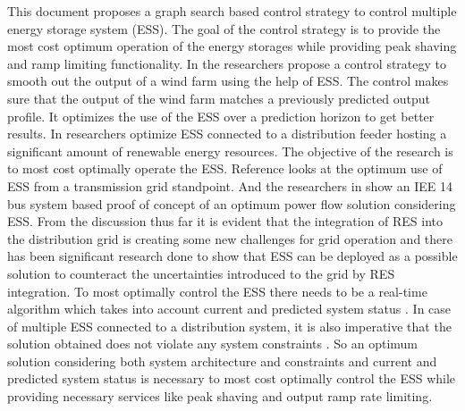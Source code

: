 \documentclass[journal]{IEEEtran}
\begin{document}
This document proposes a graph search based control strategy to control multiple energy storage system (ESS). The goal of the control strategy is to provide the most cost optimum operation of the energy storages while providing peak shaving and ramp limiting functionality. In \cite{IM1} the researchers propose a control strategy to smooth out the output of a wind farm using the help of ESS. The control makes sure that the output of the wind farm matches a previously predicted output profile. It optimizes the use of the ESS over a prediction horizon to get better results. In \cite{IM2} researchers optimize ESS connected to a distribution feeder hosting a significant amount of renewable energy resources. The objective of the research is to most cost optimally operate the ESS. Reference \cite{IM3} looks at the optimum use of ESS from a transmission grid standpoint. And the researchers in \cite{IM4} show an IEE 14 bus system based proof of concept of an optimum power flow solution considering ESS. From the discussion thus far it is evident that the integration of RES into the distribution grid is creating some new challenges for grid operation and there has been significant research done to show that ESS can be deployed as a possible solution to counteract the uncertainties introduced to the grid by RES integration. To most optimally control the ESS there needs to be a real-time algorithm which takes into account current and predicted system status \cite{gupta_francis_ospina_newaz_2018}. In case of multiple ESS connected to a distribution system, it is also imperative that the solution obtained does not violate any system constraints \cite{rt4}. So an optimum solution considering both system architecture and constraints and current and predicted system status is necessary to most cost optimally control the ESS while providing necessary services like peak shaving and output ramp rate limiting.
\end{document}
